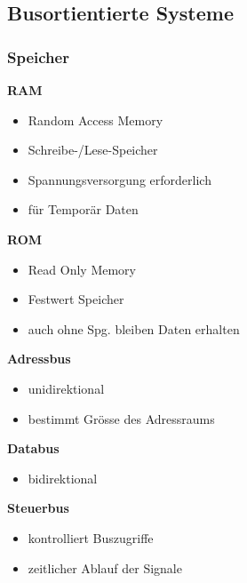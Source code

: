 \subsection{Busortientierte Systeme}
\subsubsection{Speicher}
\begin{multicols}{2}
    \textbf{RAM}
    \begin{itemize}
        \item Random Access Memory
        \item Schreibe-/Lese-Speicher
        \item Spannungsversorgung erforderlich
        \item für Temporär Daten
    \end{itemize}

    \textbf{ROM}
    \begin{itemize}
        \item Read Only Memory
        \item Festwert Speicher
        \item auch ohne Spg. bleiben Daten erhalten
    \end{itemize}
\end{multicols}

\begin{multicols}{3}
\begin{minipage}{4cm}
        \textbf{Adressbus}
    \begin{itemize}
        \item unidirektional
        \item bestimmt Grösse des Adressraums
    \end{itemize}
\end{minipage}

\begin{minipage}{4cm}
    \textbf{Databus}
    \begin{itemize}
        \item bidirektional
    \end{itemize}
\end{minipage}

\begin{minipage}{5cm}
    \textbf{Steuerbus}
    \begin{itemize}
        \item kontrolliert Buszugriffe
        \item zeitlicher Ablauf der Signale
    \end{itemize}
\end{minipage}
\end{multicols}

